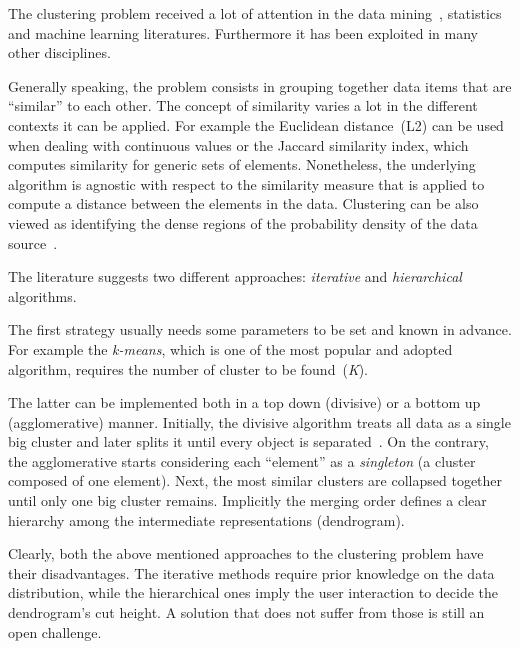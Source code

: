 The clustering problem received a lot of attention in the data mining~\cite{fayyad1996advances}, statistics~\cite{tijms1994stochastic,banfield1993model} and machine learning literatures. Furthermore it has been exploited in many other disciplines.

Generally speaking, the problem consists in grouping together data items that are ``similar'' to each other.
The concept of similarity varies a lot in the different contexts it can be applied.
For example the Euclidean distance~(L2) can be used when dealing with continuous values or the Jaccard similarity index, which computes similarity for generic sets of elements.
Nonetheless, the underlying algorithm is agnostic with respect to the similarity measure that is applied to compute a distance between the elements in the data.
Clustering can be also viewed as identifying the dense regions of the probability density of the data source~\cite{bradley1998scaling}.

The literature suggests two different approaches: \emph{iterative} and \emph{hierarchical} algorithms.

The first strategy usually needs some parameters to be set and known in advance.
For example the \emph{k-means}, which is one of the most popular and adopted algorithm,
requires the number of cluster to be found~(\emph{K}).

The latter can be implemented both in a top down (divisive) or a bottom up (agglomerative) manner.
Initially, the divisive algorithm treats all data as a single big cluster and later splits it until every object is separated~\cite{kaufman2009finding}.
On the contrary, the agglomerative starts considering each ``element'' as a \emph{singleton} (a cluster composed of one element).
Next, the most similar clusters are collapsed together until only one big cluster remains.
Implicitly the merging order defines a clear hierarchy among the intermediate representations (dendrogram).

Clearly, both the above mentioned approaches to the clustering problem have their disadvantages.
The iterative methods require prior knowledge on the data distribution, while the hierarchical ones imply the user interaction to decide the dendrogram's cut height.
A solution that does not suffer from those is still an open challenge.

